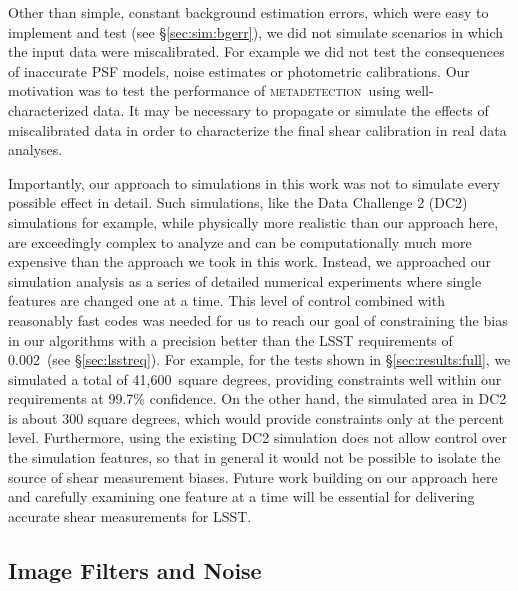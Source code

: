 \documentclass[twocolumn,twocolappendix,astrosym]{openjournal}
\newcommand{\mdet}{\textsc{metadetection}}
\newcommand{\mthresh}{0.002}
\newcommand{\fullarea}{41,600}
\begin{document}

Other than simple, constant background estimation errors, which were easy to
implement and test (see \S \ref{sec:sim:bgerr}), we did not simulate scenarios
in which the input data were miscalibrated.  For example we did not test the
consequences of inaccurate PSF models, noise estimates or photometric
calibrations.  Our motivation was to test the performance of \mdet\ using
well-characterized data. It may be necessary to propagate or simulate the
effects of miscalibrated data in order to characterize the final shear
calibration in real data analyses.

Importantly, our approach to simulations in this work was not to simulate every
possible effect in detail. Such simulations, like the Data Challenge 2 (DC2)
simulations \citep{DC2Abolfathi2021} for example, while physically more
realistic than our approach here, are exceedingly complex to analyze and can be
computationally much more expensive than the approach we took in this work.
Instead, we approached our simulation analysis as a series of detailed
numerical experiments where single features are changed one at a time. This
level of control combined with reasonably fast codes was needed for us to reach
our goal of constraining the bias in our algorithms with a precision better
than the LSST requirements of \mthresh\ (see \S \ref{sec:lsstreq}). For
example, for the tests shown in \S \ref{sec:results:full}, we simulated a total
of \fullarea\ square degrees, providing constraints well within our
requirements at 99.7\% confidence. On the other hand, the simulated area in DC2
is about 300 square degrees, which would provide constraints only at the
percent level. Furthermore, using the existing DC2 simulation does not allow
control over the simulation features, so that in general it would not be
possible to isolate the source of shear measurement biases. Future work
building on our approach here and carefully examining one feature at a time
will be essential for delivering accurate shear measurements for LSST.

\subsection{Image Filters and Noise} \label{sec:sim:noise}
\end{document}
